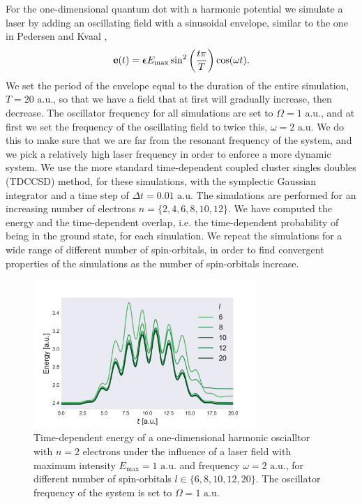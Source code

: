 For the one-dimensional quantum dot with a harmonic potential we simulate a laser by 
adding an oscillating 
field with a sinusoidal envelope, similar to the one in
Pedersen and Kvaal \cite{pedersen2019symplectic},
\begin{equation}
    \label{eq:results_1d_field}
    \vb{e}(t) = \boldsymbol{\epsilon} E_\text{max}\sin^2\left(\frac{t\pi}{T}\right)\cos(\omega t).
\end{equation}
We set the period of the envelope equal to the duration of the entire simulation,
$T=20 \text{ a.u.}$, so that we have a field that at first will gradually increase, then decrease.
The oscillator frequency for all simulations are set to $\Omega=1 \text{ a.u.}$, and at first we 
set the frequency of the oscillating field to twice this, $\omega = 2 \text{ a.u.}$ We do this 
to make sure that we are far from the resonant frequency of the system, and we pick 
a relatively high laser frequency in order to enforce a more dynamic system. We use the 
more standard time-dependent coupled cluster singles doubles (TDCCSD) method, for 
these simulations, with the symplectic Gaussian integrator and a time step of
$\Delta t=0.01 \text{ a.u.}$
The simulations are performed for an increasing number of electrons
$n = \{2,4,6,8,10,12\}$. We have computed the energy and the time-dependent overlap,
i.e. the time-dependent probability of being in the ground state, for each simulation.
We repeat the simulations for a wide range of different number of spin-orbitals,
in order to find convergent properties of the simulations as the number of spin-orbitals increase.

\begin{figure}[ht]
    \centering
    \includegraphics[width=0.75\textwidth]{results/figures/1D/n=2energy.png} 
    \caption{Time-dependent energy of a one-dimensional harmonic oscialltor 
        with $n=2$ electrons
        under the influence of a laser field with maximum intensity $E_\text{max} = 1 \text{ a.u.}$
        and frequency $\omega = 2 \text{ a.u.}$, for different number of spin-orbitals
        $l\in\{6,8,10,12,20\}$. The oscillator frequency of the system is set to
        $\Omega = 1 \text{ a.u.}$
    }
    \label{fig:1d_n2_E}
\end{figure}

